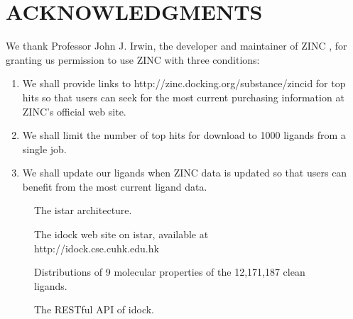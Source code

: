 \documentclass[12pt]{article}
\begin{document}
\section*{\sffamily \large ACKNOWLEDGMENTS}

We thank Professor John J. Irwin, the developer and maintainer of ZINC \citep{532,1178}, for granting us permission to use ZINC with three conditions:
\begin{enumerate}
\item We shall provide links to http://zinc.docking.org/substance/zincid for top hits so that users can seek for the most current purchasing information at ZINC's official web site.
\item We shall limit the number of top hits for download to 1000 ligands from a single job.
\item We shall update our ligands when ZINC data is updated so that users can benefit from the most current ligand data.
\end{enumerate}


\clearpage





\clearpage

\begin{figure}
\caption{\label{architecture} The istar architecture.}
\end{figure}

\begin{figure}
\caption{\label{idock} The idock web site on istar, available at http://idock.cse.cuhk.edu.hk}
\end{figure}

\begin{figure}
\caption{\label{LigandProperties} Distributions of 9 molecular properties of the 12,171,187 clean ligands.}
\end{figure}

\begin{figure}
\caption{\label{idock-rest} The RESTful API of idock.}
\end{figure}
\end{document}
